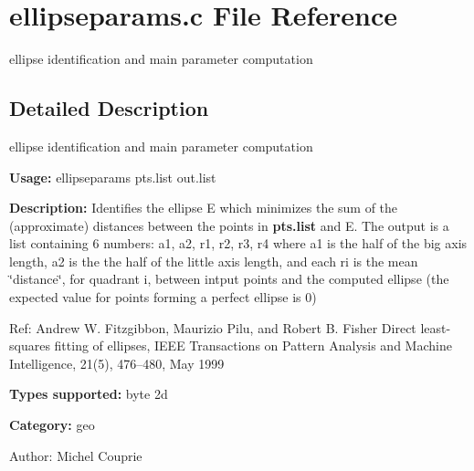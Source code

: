 \section{ellipseparams.c File Reference}
\label{ellipseparams_8c}
ellipse identification and main parameter computation  




\label{_details}
\subsection{Detailed Description}
ellipse identification and main parameter computation 

{\bf Usage:} ellipseparams pts.list out.list

{\bf Description:} Identifies the ellipse E which minimizes the sum of the (approximate) distances between the points in {\bf pts.list} and E. The output is a list containing 6 numbers: a1, a2, r1, r2, r3, r4 where a1 is the half of the big axis length, a2 is the the half of the little axis length, and each ri is the mean \char`\"{}distance\char`\"{}, for quadrant i, between intput points and the computed ellipse (the expected value for points forming a perfect ellipse is 0)

Ref: Andrew W. Fitzgibbon, Maurizio Pilu, and Robert B. Fisher Direct least-squares fitting of ellipses, IEEE Transactions on Pattern Analysis and Machine Intelligence, 21(5), 476--480, May 1999

{\bf Types supported:} byte 2d

{\bf Category:} geo

\begin{Desc}
\item[Author:]Michel Couprie \end{Desc}
